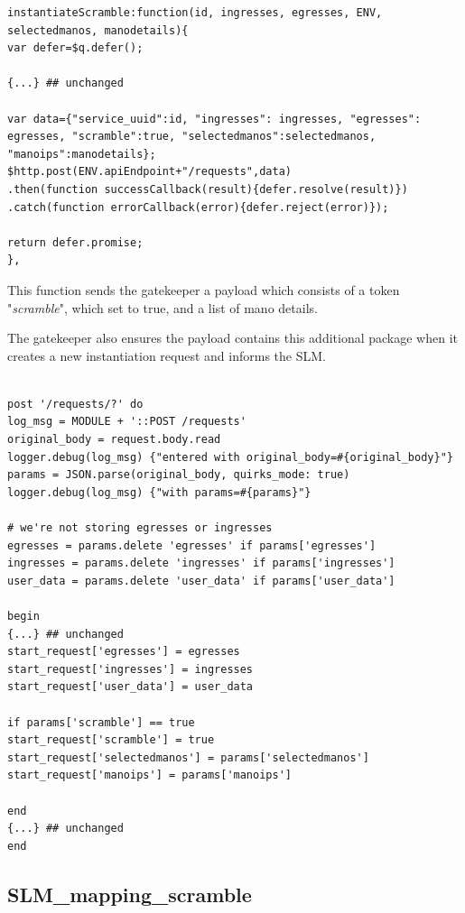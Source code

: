 \begin{lstlisting}[caption=BSS instantiateScramble function, label=lis:BSSscramble]
instantiateScramble:function(id, ingresses, egresses, ENV, selectedmanos, manodetails){				
var defer=$q.defer();

{...} ## unchanged

var data={"service_uuid":id, "ingresses": ingresses, "egresses": egresses, "scramble":true, "selectedmanos":selectedmanos, "manoips":manodetails};
$http.post(ENV.apiEndpoint+"/requests",data)
.then(function successCallback(result){defer.resolve(result)})
.catch(function errorCallback(error){defer.reject(error)});

return defer.promise;
},

\end{lstlisting}

This function sends the gatekeeper a payload which consists of a token "\textit{scramble}", which set to true, and a list of mano details.

The gatekeeper also ensures the payload contains this additional package when it creates a new instantiation request and informs the SLM. 

\begin{lstlisting}[caption=create instantiation request in gatekeeper, label=lis:request.rb]

post '/requests/?' do
log_msg = MODULE + '::POST /requests'
original_body = request.body.read
logger.debug(log_msg) {"entered with original_body=#{original_body}"}
params = JSON.parse(original_body, quirks_mode: true)
logger.debug(log_msg) {"with params=#{params}"}

# we're not storing egresses or ingresses
egresses = params.delete 'egresses' if params['egresses']
ingresses = params.delete 'ingresses' if params['ingresses']
user_data = params.delete 'user_data' if params['user_data']

begin
{...} ## unchanged
start_request['egresses'] = egresses
start_request['ingresses'] = ingresses
start_request['user_data'] = user_data

if params['scramble'] == true
start_request['scramble'] = true 
start_request['selectedmanos'] = params['selectedmanos']
start_request['manoips'] = params['manoips']

end
{...} ## unchanged
end

\end{lstlisting}

\subsection{\textbf{SLM\_mapping\_scramble}}

